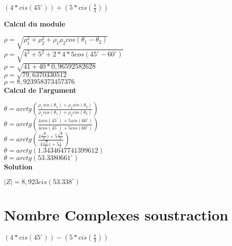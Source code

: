 $(4 * cis(45^{\circ} )) + (5 * cis(\frac{\pi}{3}))$

\vspace{10mm}
\textbf{Calcul du module}
\vspace{5mm}

$\rho = \sqrt{\rho_{1}^{2} + \rho_{2}^{2} + \rho_{1} \rho_{2} cos(\theta_{1} - \theta_{2}) }$ \\

$\rho = \sqrt{4^{2} + 5^{2} + 2 * 4 * 5 cos(45^{\circ} - 60^{\circ})}$ \\

$\rho = \sqrt{41 + 40 * 0,96592582628}$ \\

$\rho = \sqrt{79,6370330512}$ \\

$\rho = 8,923958373457376 $ \\

\vspace{6mm}
\textbf{Calcul de l'argument}
\vspace{5mm}

$\theta = arctg(\frac{\rho_{1}sin(\theta_{1}) + \rho_{2}sin(\theta_{2})} {\rho_{1}cos(\theta_{1}) + \rho_{2}cos(\theta_{2})} )$ \\

$\theta = arctg(\frac{4sin(45^{\circ}) + 5sin(60^{\circ})} {4cos(45^{\circ}) + 5cos(60^{\circ})} )$ \\

$\theta = arctg(\frac{4\frac{\sqrt{2}}{2}) + 5\frac{\sqrt{3}}{2} } {4\frac{\sqrt{2}}{2}) + 5\frac{1}{2}})$ \\

$\theta = arctg(1.3434647741399612)$ \\

$\theta = arctg(53.3380661^{\circ})$ \\

\vspace{6mm}
\textbf{Solution}
\vspace{5mm}

$|Z| = 8,923 cis(53.338^{\circ})$


\newpage
\section{Nombre Complexes soustraction}
\vspace{3mm} %

$(4 * cis(45^{\circ} )) - (5 * cis(\frac{\pi}{3}))$


